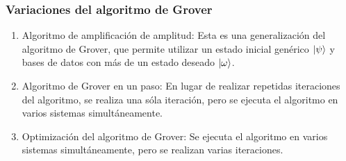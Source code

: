 \documentclass[xetex,mathserif,serif]{beamer}
\begin{document}
\begin{frame}
    \frametitle{Variaciones del algoritmo de Grover}

    \begin{enumerate}
        \item Algoritmo de amplificación de amplitud:
            Esta es una generalización del algoritmo de Grover, que permite utilizar un estado inicial genérico $\ket{\psi}$ y bases de datos con más de un estado deseado $\ket{\omega}$.
        \item Algoritmo de Grover en un paso:
            En lugar de realizar repetidas iteraciones del algoritmo, se realiza una sóla iteración, pero se ejecuta el algoritmo en varios sistemas simultáneamente.
        \item Optimización del algoritmo de Grover:
            Se ejecuta el algoritmo en varios sistemas simultáneamente, pero se realizan varias iteraciones.
    \end{enumerate}

\end{frame}
\end{document}
